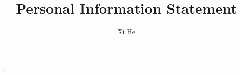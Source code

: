 \documentclass[12pt]{article}
\def\name{Xi He}
\begin{document}
\newcommand{\AUTHOR}{%
Xi He\\
}
\newcommand{\TITLE}{Personal Information Statement}


\title{\TITLE}
\author{\AUTHOR}




.
\end{document}
